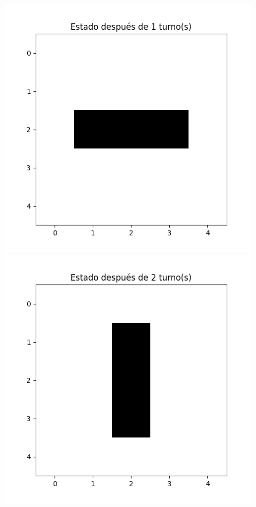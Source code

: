 \begin{enumerate}
\begin{itemize}
\begin{center}
    \includegraphics[scale=0.4]{Practica05/IMA/ejemplosJuegoVida/ejemplo 2.2.png}
    \includegraphics[scale=0.4]{Practica05/IMA/ejemplosJuegoVida/ejemplo 2.3.png}

\end{center}
\end{itemize}
\end{enumerate}

